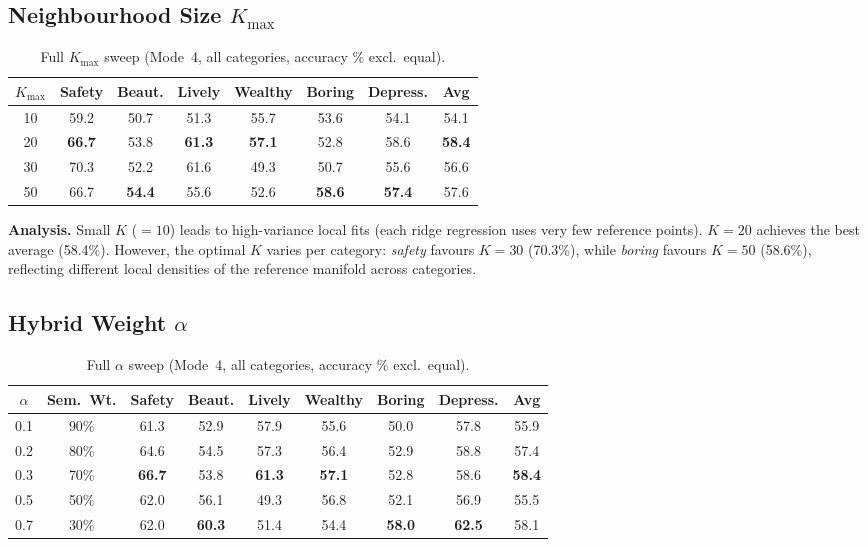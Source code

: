 \documentclass[runningheads]{llncs}
\begin{document}
\subsection{Neighbourhood Size $K_{\max}$}

\begin{table}[H]
\centering
\caption{Full $K_{\max}$ sweep (Mode~4, all categories, accuracy \% excl.\ equal).}
\label{tab:k_sweep}
\small
\setlength{\tabcolsep}{4pt}
\begin{tabular}{ccccccc|c}
\toprule
$K_{\max}$ & Safety & Beaut. & Lively & Wealthy & Boring & Depress. & Avg \\
\midrule
10 & 59.2 & 50.7 & 51.3 & 55.7 & 53.6 & 54.1 & 54.1 \\
20 & \textbf{66.7} & 53.8 & \textbf{61.3} & \textbf{57.1} & 52.8 & 58.6 & \textbf{58.4} \\
30 & 70.3 & 52.2 & 61.6 & 49.3 & 50.7 & 55.6 & 56.6 \\
50 & 66.7 & \textbf{54.4} & 55.6 & 52.6 & \textbf{58.6} & \textbf{57.4} & 57.6 \\
\bottomrule
\end{tabular}
\end{table}

\noindent\textbf{Analysis.}
Small $K$ ($=10$) leads to high-variance local fits (each ridge regression uses very few reference points).
$K{=}20$ achieves the best average (58.4\%). However, the optimal $K$ varies per category: \emph{safety} favours $K{=}30$ (70.3\%), while \emph{boring} favours $K{=}50$ (58.6\%), reflecting different local densities of the reference manifold across categories.

\subsection{Hybrid Weight $\alpha$}

\begin{table}[H]
\centering
\caption{Full $\alpha$ sweep (Mode~4, all categories, accuracy \% excl.\ equal).}
\label{tab:alpha_sweep}
\small
\setlength{\tabcolsep}{4pt}
\begin{tabular}{cccccccc|c}
\toprule
$\alpha$ & Sem.\ Wt. & Safety & Beaut. & Lively & Wealthy & Boring & Depress. & Avg \\
\midrule
0.1 & 90\% & 61.3 & 52.9 & 57.9 & 55.6 & 50.0 & 57.8 & 55.9 \\
0.2 & 80\% & 64.6 & 54.5 & 57.3 & 56.4 & 52.9 & 58.8 & 57.4 \\
0.3 & 70\% & \textbf{66.7} & 53.8 & \textbf{61.3} & \textbf{57.1} & 52.8 & 58.6 & \textbf{58.4} \\
0.5 & 50\% & 62.0 & 56.1 & 49.3 & 56.8 & 52.1 & 56.9 & 55.5 \\
0.7 & 30\% & 62.0 & \textbf{60.3} & 51.4 & 54.4 & \textbf{58.0} & \textbf{62.5} & 58.1 \\
\bottomrule
\end{tabular}
\end{table}
\end{document}
